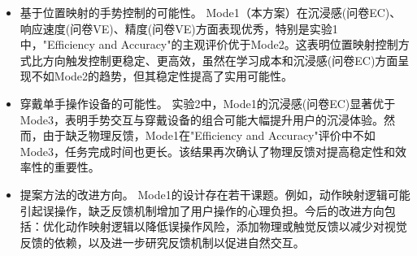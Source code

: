 \begin{itemize}
    \item 基于位置映射的手势控制的可能性。
          Mode1（本方案）在沉浸感(问卷EC)、响应速度(问卷VE)、精度(问卷VE)方面表现优秀，特别是实验1中，"Efficiency and Accuracy"的主观评价优于Mode2。这表明位置映射控制方式比方向触发控制更稳定、更高效，虽然在学习成本和沉浸感(问卷EC)方面呈现不如Mode2的趋势，但其稳定性提高了实用可能性。

    \item 穿戴单手操作设备的可能性。
          实验2中，Mode1的沉浸感(问卷EC)显著优于Mode3，表明手势交互与穿戴设备的组合可能大幅提升用户的沉浸体验。然而，由于缺乏物理反馈，Mode1在"Efficiency and Accuracy"评价中不如Mode3，任务完成时间也更长。该结果再次确认了物理反馈对提高稳定性和效率性的重要性。

    \item 提案方法的改进方向。
          Mode1的设计存在若干课题。例如，动作映射逻辑可能引起误操作，缺乏反馈机制增加了用户操作的心理负担。今后的改进方向包括：优化动作映射逻辑以降低误操作风险，添加物理或触觉反馈以减少对视觉反馈的依赖，以及进一步研究反馈机制以促进自然交互。
\end{itemize}

\ifx\allfiles\undefined

\fi
